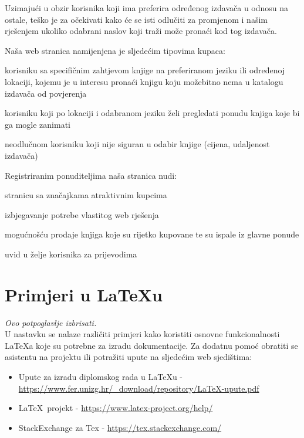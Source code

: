 		Uzimajući u obzir korisnika koji ima preferira određenog izdavača u odnosu na ostale, teško je za očekivati kako će se isti odlučiti za promjenom i našim rješenjem ukoliko odabrani naslov koji traži može pronaći kod tog izdavača.
		
		Naša web stranica namijenjena je sljedećim tipovima kupaca:
		
		\begin{packed_enum}
			\item korisniku sa specifičnim zahtjevom knjige na preferiranom jeziku ili određenoj lokaciji, kojemu je u interesu pronaći knjigu koju možebitno nema u katalogu izdavača od povjerenja
			\item korisniku koji po lokaciji i odabranom jeziku želi pregledati ponudu knjiga koje bi ga mogle zanimati
			\item neodlučnom korisniku koji nije siguran u odabir knjige (cijena, udaljenost izdavača)
		\end{packed_enum}
		
		Registriranim ponuditeljima naša stranica nudi:	
		
		\begin{packed_enum}
			\item stranicu sa značajkama atraktivnim kupcima
			\item izbjegavanje potrebe vlastitog web rješenja
			\item mogućnošću prodaje knjiga koje su rijetko kupovane te su ispale iz glavne ponude
			\item uvid u želje korisnika za prijevodima
		\end{packed_enum}
		
		
		
		
		
		
		\section{Primjeri u \LaTeX u}
		
		\textit{Ovo potpoglavlje izbrisati.}\\

		U nastavku se nalaze različiti primjeri kako koristiti osnovne funkcionalnosti \LaTeX a koje su potrebne za izradu dokumentacije. Za dodatnu pomoć obratiti se asistentu na projektu ili potražiti upute na sljedećim web sjedištima:
		\begin{itemize}
			\item Upute za izradu diplomskog rada u \LaTeX u - \url{https://www.fer.unizg.hr/_download/repository/LaTeX-upute.pdf}
			\item \LaTeX\ projekt - \url{https://www.latex-project.org/help/}
			\item StackExchange za Tex - \url{https://tex.stackexchange.com/}\\
		
		\end{itemize} 	


